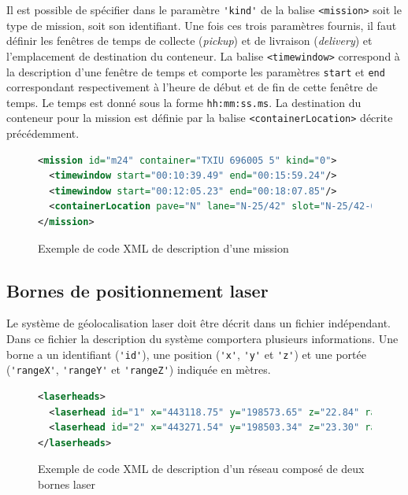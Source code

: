 Il est possible de spécifier dans le paramètre \verb!'kind'! de la balise \verb!<mission>! soit le type de mission, soit son identifiant. Une fois ces trois paramètres fournis, il faut définir les fenêtres de temps de collecte (\textit{pickup}) et de livraison (\textit{delivery}) et l'emplacement de destination du conteneur. La balise \verb!<timewindow>! correspond à la description d'une fenêtre de temps et comporte les paramètres \verb!start! et \verb!end! correspondant respectivement à l'heure de début et de fin de cette fenêtre de temps. Le temps est donné sous la forme \verb!hh:mm:ss.ms!. La destination du conteneur pour la mission est définie par la balise \verb!<containerLocation>! décrite précédemment.

\begin{figure}[ht]
\centering
 \begin{lstlisting}[language=XML]
<mission id="m24" container="TXIU 696005 5" kind="0">
  <timewindow start="00:10:39.49" end="00:15:59.24"/>
  <timewindow start="00:12:05.23" end="00:18:07.85"/>
  <containerLocation pave="N" lane="N-25/42" slot="N-25/42-0" level="1" align="center"/>
</mission>
\end{lstlisting}
\caption{Exemple de code XML de description d'une mission}
\label{fig:simulation:mission}
\end{figure}

\subsection{Bornes de positionnement laser}\label{sec:description:bornesLaser}

Le système de géolocalisation laser doit être décrit dans un fichier indépendant. Dans ce fichier la description du système comportera plusieurs informations. Une borne a un identifiant (\verb!'id'!), une position (\verb!'x'!, \verb!'y'! et \verb!'z'!) et une portée (\verb!'rangeX'!, \verb!'rangeY'! et \verb!'rangeZ'!) indiquée en mètres.

\begin{figure}[ht]
\centering
 \begin{lstlisting}[language=XML]
<laserheads>
  <laserhead id="1" x="443118.75" y="198573.65" z="22.84" rangeX="125" rangeY="100" rangeZ="40"/>
  <laserhead id="2" x="443271.54" y="198503.34" z="23.30" rangeX="125" rangeY="100" rangeZ="40"/>
</laserheads>
\end{lstlisting}
\caption{Exemple de code XML de description d'un réseau composé de deux bornes laser}
\label{fig:simulation:xmlbornes}
\end{figure}

